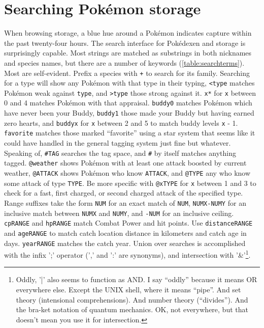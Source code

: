 \section{Searching Pokémon storage\label{sec:searching}}
When browsing storage, a blue hue around a Pokémon indicates capture within the past twenty-four hours.
The search interface for Pokédexen and storage is surprisingly capable.
Most strings are matched as substrings in both nicknames and species names,
 but there are a number of keywords (\autoref{table:searchterms}).
Most are self-evident.
Prefix a species with \texttt{+} to search for its family.
Searching for a type will show any Pokémon with that type in their typing,
 \texttt{<type} matches Pokémon weak against \texttt{type},
 and \texttt{>type} those strong against it.
\texttt{x*} for \texttt{x} between 0 and 4 matches Pokémon with that appraisal.
\texttt{buddy0} matches Pokémon which have never been your Buddy,
 \texttt{buddy1} those made your Buddy but having earned zero hearts,
 and \texttt{buddyx} for \texttt{x} between 2 and 5 to match buddy
 levels \texttt{x} - 1.
\texttt{favorite} matches those marked ``favorite'' using a star system that
 seems like it could have handled in the general tagging system just fine
 but whatever.
Speaking of, \texttt{\#TAG} searches the tag space, and \texttt{\#} by itself
 matches anything tagged.
\texttt{@weather} shows Pokémon with at least one attack boosted by current
 weather, \texttt{@ATTACK} shows Pokémon who know \texttt{ATTACK}, and \texttt{@TYPE}
 any who know some attack of type \texttt{TYPE}.
Be more specific with \texttt{@xTYPE} for \texttt{x} between 1 and 3 to check
  for a fast, first charged, or second charged attack of the specified type.
Range suffixes take the form \texttt{NUM} for an exact match of \texttt{NUM},
  \texttt{NUMX-NUMY} for an inclusive match between \texttt{NUMX} and \texttt{NUMY},
  and \texttt{-NUM} for an inclusive ceiling.
\texttt{cpRANGE} and \texttt{hpRANGE} match Combat Power and hit points.
Use \texttt{distanceRANGE} and \texttt{ageRANGE} to match catch location
  distance in kilometers and catch age in days.
\texttt{yearRANGE} matches the catch year.
Union over searches is accomplished with the infix ';' operator (',' and ':' are synonyms),
  and intersection with '\&'\footnote{Oddly, '|' also seems to function as AND. I say ``oddly'' because it means OR everywhere else.
  Except the UNIX shell, where it means ``pipe''.
  And set theory (intensional comprehensions).
  And number theory (``divides'').
  And the bra-ket notation of quantum mechanics.
  OK, not everywhere, but that doesn't mean you use it for intersection.}.
